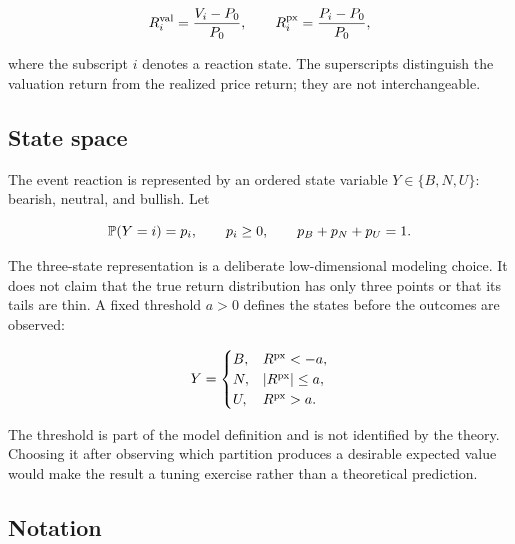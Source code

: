 \[
R^{\mathrm{val}}_i=\frac{V_i-P_0}{P_0},
\qquad
R^{\mathrm{px}}_i=\frac{P_i-P_0}{P_0},
\]

where the subscript $i$ denotes a reaction state. The superscripts distinguish
the valuation return from the realized price return; they are not interchangeable.

\subsection{State space}

The event reaction is represented by an ordered state variable
$Y\in\{B,N,U\}$: bearish, neutral, and bullish. Let

\[
\mathbb{P}(Y=i)=p_i,
\qquad
p_i\ge 0,
\qquad
p_B+p_N+p_U=1.
\]

The three-state representation is a deliberate low-dimensional modeling choice.
It does not claim that the true return distribution has only three points or
that its tails are thin. A fixed threshold $a>0$ defines the states before the
outcomes are observed:

\[
Y=
\begin{cases}
B, & R^{\mathrm{px}}<-a,\\
N, & |R^{\mathrm{px}}|\le a,\\
U, & R^{\mathrm{px}}>a.
\end{cases}
\]

The threshold is part of the model definition and is not identified by the
theory. Choosing it after observing which partition produces a desirable
expected value would make the result a tuning exercise rather than a theoretical
prediction.

\subsection{Notation}


